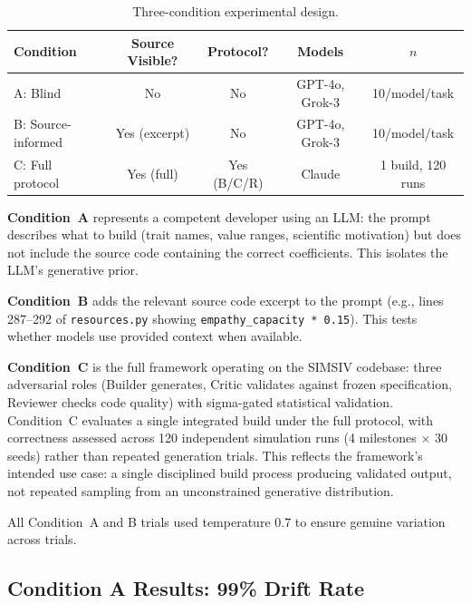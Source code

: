 \documentclass[11pt,a4paper]{article}
\begin{document}
\begin{table}[ht]
\centering
\caption{Three-condition experimental design.}
\label{tab:conditions}
\begin{tabular}{@{}lcccc@{}}
\toprule
Condition & Source Visible? & Protocol? & Models & $n$ \\
\midrule
A: Blind & No & No & GPT-4o, Grok-3 & 10/model/task \\
B: Source-informed & Yes (excerpt) & No & GPT-4o, Grok-3 & 10/model/task \\
C: Full protocol & Yes (full) & Yes (B/C/R) & Claude & 1 build, 120 runs \\
\bottomrule
\end{tabular}
\end{table}

\textbf{Condition~A} represents a competent developer using an LLM: the prompt describes what to build (trait names, value ranges, scientific motivation) but does not include the source code containing the correct coefficients. This isolates the LLM's generative prior.

\textbf{Condition~B} adds the relevant source code excerpt to the prompt (e.g., lines 287--292 of \texttt{resources.py} showing \texttt{empathy\_capacity * 0.15}). This tests whether models use provided context when available.

\textbf{Condition~C} is the full framework operating on the SIMSIV codebase: three adversarial roles (Builder generates, Critic validates against frozen specification, Reviewer checks code quality) with sigma-gated statistical validation. Condition~C evaluates a single integrated build under the full protocol, with correctness assessed across 120 independent simulation runs (4 milestones $\times$ 30 seeds) rather than repeated generation trials. This reflects the framework's intended use case: a single disciplined build process producing validated output, not repeated sampling from an unconstrained generative distribution.

All Condition~A and B trials used temperature 0.7 to ensure genuine variation across trials.

\subsection{Condition A Results: 99\% Drift Rate}
\end{document}
